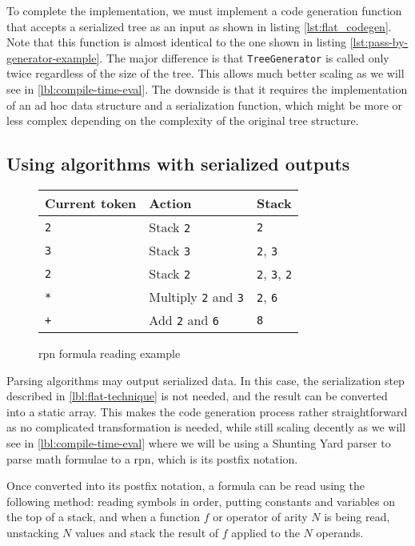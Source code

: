 \documentclass[../main]{subfiles}
\begin{document}
To complete the implementation, we must implement a code generation function
that accepts a serialized tree as an input as shown in listing
\ref{lst:flat_codegen}. Note that this function is almost identical to
the one shown in listing \ref{lst:pass-by-generator-example}.
The major difference is that \lstinline{TreeGenerator} is called only
twice regardless of the size of the tree. This allows much better scaling
as we will see in \ref{lbl:compile-time-eval}.
The downside is that it requires the implementation of an ad hoc data
structure and a serialization function, which might be more or less complex
depending on the complexity of the original tree structure.

\subsection{
  Using algorithms with serialized outputs
}
\label{lbl:codegen-from-rpn}

\begin{figure}[h]
\begin{tabular}{|l|l|l|}
\hline
Current token & Action & Stack \\
\hline
\lstinline|2| & Stack \lstinline|2| & \lstinline|2| \\
\lstinline|3| & Stack \lstinline|3| & \lstinline|2|, \lstinline|3| \\
\lstinline|2| & Stack \lstinline|2| & \lstinline|2|, \lstinline|3|, \lstinline|2| \\
\lstinline|*| & Multiply \lstinline|2| and \lstinline|3| & \lstinline|2|, \lstinline|6| \\
\lstinline|+| & Add \lstinline|2| and \lstinline|6| & \lstinline|8| \\
\hline
\end{tabular}
\centering
\caption{\gls{rpn} formula reading example}
\label{fig:rpn-reading-example}
\end{figure}

Parsing algorithms may output serialized data. In this case, the serialization
step described in \ref{lbl:flat-technique} is not needed, and the result
can be converted into a static array.
This makes the code generation process rather straightforward as no complicated
transformation is needed, while still scaling decently as we will see in
\ref{lbl:compile-time-eval} where we will be using a
Shunting Yard parser \cite{shunting-yard} to parse math formulae to a
\gls{rpn}, which is its postfix notation.

Once converted into its postfix notation,
a formula can be read using the following method:
reading symbols in order,
putting constants and variables on the top of a stack, and
when a function $f$ or operator of arity $N$ is being read,
unstacking $N$ values and stack the result of $f$ applied
to the $N$ operands.
\end{document}
